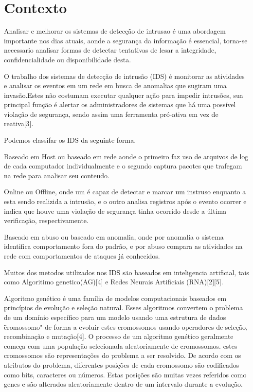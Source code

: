 \documentclass[
	12pt,				%
	openright,			%
	oneside,
	a4paper,			%
	english,			%
	french,				%
	spanish,			%
	brazil				%
	]{abntex2}
\begin{document}
\section{Contexto}

Analisar e melhorar os sistemas de detecção de intrusao é uma abordagem importante nos dias atuais, aonde a segurança da informação é essencial, torna-se necessario analisar formas de detectar tentativas de lesar a integridade, confidencialidade ou disponibilidade desta.

O trabalho dos sistemas de detecção de intrusão (IDS) é monitorar as atividades e analisar os eventos em um rede em busca de anomalias que sugiram uma invasão.Estes não costumam executar qualquer ação para impedir intrusões, sua principal função é alertar os administradores de sistemas que há uma possível violação de segurança, sendo assim uma ferramenta pró-ativa em vez de reativa[3].

Podemos classifar os IDS da seguinte forma. 

Baseado em Host ou baseado em rede aonde o primeiro faz uso de arquivos de log de cada computador individualmente e o segundo captura pacotes que trafegam na rede para analisar seu conteudo.

Online ou Offline, onde um é capaz de detectar e marcar um instruso enquanto a esta sendo realizida a intrusão, e o outro analisa registros após o evento ocorrer e indica que houve uma violação de segurança tinha ocorrido desde a última verificação, respectivamente.

Baseado em abuso ou baseado em anomalia, onde por anomalia o sistema identifica comportamento fora do padrão, e por abuso compara as atividades na rede com comportamentos de ataques já conhecidos.

Muitos dos metodos utilizados nos IDS são baseados em inteligencia artificial, tais como Algoritimo genetico(AG)[4] e Redes Neurais Artificiais (RNA)[2][5].

Algoritmo genético é uma família de modelos computacionais baseados em princípios de evolução e seleção natural. Esses algoritmos convertem o problema de um domínio específico para um modelo usando uma estrutura de dados  \"cromossomo" de forma a evoluir estes cromossomos usando operadores de seleção, recombinação e mutação[4]. 
O processo de um algoritmo genético geralmente começa com uma população selecionada aleatoriamente de cromossomos. estes cromossomos são representações do problema a ser resolvido. De acordo com os atributos do problema, diferentes posições de cada cromossomo são codificados como bits, caracteres ou números. Estas posições são muitas vezes referidos como genes e são alterados aleatoriamente dentro de um intervalo durante a evolução. 
\end{document}
